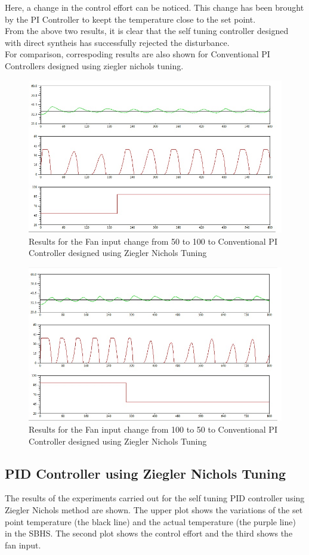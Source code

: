 Here, a change in the control effort can be noticed. This change has been brought by the PI Controller to keept the temperature close to the set point.\\
From the above two results, it is clear that the self tuning controller designed with direct syntheis has successfully rejected the disturbance.\\
\newpage
For comparison, correspoding results are also shown for Conventional PI Controllers designed using ziegler nichols tuning.

\begin{figure}[h]
	\centering
\includegraphics[width=.75\linewidth]{Vikas_self/report_tex/PID_results/Conventional_Tuning/Fan_disturbance/PI/step50to100.jpg}
	\caption{Results for the Fan input change from 50 to 100 to Conventional PI Controller designed using Ziegler Nichols Tuning}
\end{figure}

\begin{figure}[h]
	\centering
\includegraphics[width=.75\linewidth]{Vikas_self/report_tex/PID_results/Conventional_Tuning/Fan_disturbance/PI/step100to50.jpg}
	\caption{Results for the Fan input change from 100 to 50 to Conventional PI Controller designed using Ziegler Nichols Tuning}
\end{figure}


\newpage
\subsection{PID Controller using Ziegler Nichols Tuning}
The results of the experiments carried out for the self tuning PID controller using Ziegler Nichols method are shown. The upper plot shows the variations of the set point temperature (the black line) and the actual temperature (the purple line) in the SBHS. The second plot shows the control effort and the third shows the fan input.

